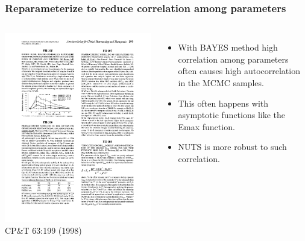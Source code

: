 \documentclass{beamer}
\begin{document}
\begin{frame}
  \frametitle{\large Reparameterize to reduce correlation among parameters}
  
  \begin{columns}
    \includegraphics[width=\textwidth]{graphics/BachmanGillespie_tuncatedEmaxAbstract_CPT1998.pdf}\\
    CP\&T 63:199 (1998)
    \begin{itemize}
\item With BAYES method high correlation among parameters often causes
  high autocorrelation in the MCMC samples.
\item This often happens with asymptotic functions like the Emax
  function. 
\item NUTS is more robust to such correlation.
    \end{itemize}
  \end{columns}

\end{frame}
\end{document}
